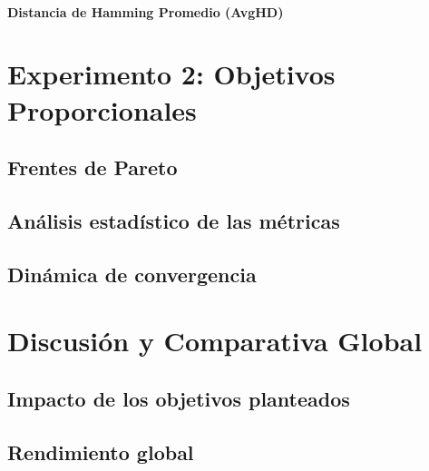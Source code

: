 \paragraph{Distancia de Hamming Promedio (AvgHD)}



\section{Experimento 2: Objetivos Proporcionales}
\subsection{Frentes de Pareto}
\subsection{Análisis estadístico de las métricas}
\subsection{Dinámica de convergencia}


\section{Discusión y Comparativa Global}
\subsection{Impacto de los objetivos planteados}
\subsection{Rendimiento global}
